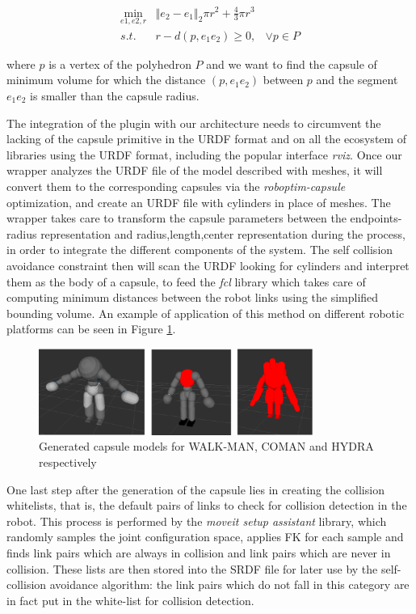 \begin{eqnarray*}
\min_{e1,e2,r} & \left\Vert e_2 - e_1 \right\Vert_2 \pi r^2+\frac{4}{3}\pi r^3\\
{s.t.}  & r-d(p,e_1e_2) \ge 0, & \vee p \in P
\end{eqnarray*}

where $p$ is a vertex of the polyhedron $P$ and we want to find the capsule of minimum volume for which the distance $(p,e_1e_2)$ between $p$ and the segment $e_1e_2$ is smaller than the capsule radius.

The integration of the plugin with our architecture needs to circumvent the lacking of the capsule primitive in the URDF format and on all the ecosystem of libraries using the URDF format, including the popular interface \emph{rviz}.
Once our wrapper analyzes the URDF file of the model described with meshes, it will convert them to the corresponding capsules via the \emph{roboptim-capsule} optimization, and create an URDF file with cylinders in place of meshes. The wrapper takes care to transform the capsule parameters between the endpoints-radius representation and radius,length,center representation during the process, in order to integrate the different components of the system.
The self collision avoidance constraint then will scan the URDF looking for cylinders and interpret them as the body of a capsule, to feed the \emph{fcl} library which takes care of computing minimum distances between the robot links using the simplified bounding volume. 
An example of application of this method on different robotic platforms can be seen in Figure \ref{fig:capsules}.
\begin{figure}
\vspace{2 mm}
\centering \includegraphics[width=0.8\textwidth]{images/software/robots_capsules.eps} 
\caption{Generated capsule models for WALK-MAN, COMAN and HYDRA respectively} 
\label{fig:capsules}
\end{figure}
One last step after the generation of the capsule lies in creating the collision whitelists, that is, the default pairs of links to check for collision detection in the robot. This process is performed by the \emph{moveit setup assistant}\cite{Coleman2014-bd} library, which randomly samples the joint configuration space, applies FK for each sample and finds link pairs which are always in collision and link pairs which are never in collision. These lists are then stored into the SRDF file for later use by the self-collision avoidance algorithm: the link pairs which do not fall in this category are in fact put in the white-list for collision detection.

